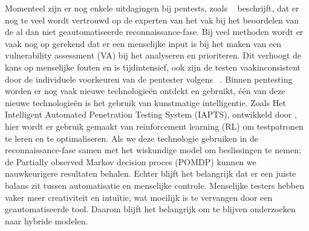 Momenteel zijn er nog enkele uitdagingen bij pentests, zoals ~\textcite{Fugkeaw} beschrijft, dat er nog te veel wordt vertrouwd 
op de experten van het vak bij het beoordelen van de al dan niet geautomatiseerde reconnaissance-fase. Bij veel methoden wordt er vaak nog op gerekend dat er een menselijke input is bij het maken van een vulnerability assessment (VA) bij het analyseren en prioriteren. Dit verhoogt de kans op menselijke fouten en is tijdintensief, ook zijn de testen vaakinconsistent door de individuele voorkeuren van de pentester volgens ~\textcite{Ghanem}.
Binnen pentesting worden er nog vaak nieuwe technologieën ontdekt en gebruikt, één van deze nieuwe technologieën is het gebruik van kunstmatige intelligentie. Zoals Het Intelligent Automated Penetration Testing System (IAPTS), ontwikkeld door \textcite{Ghanem}, hier wordt er gebruik gemaakt van reinforcement learning (RL) om testpatronen te leren en te optimaliseren. Als we deze technologie gebruiken in de reconnaissance-fase samen met het wiskundige model om beslissingen te nemen; de Partially observed Markov decision proces (POMDP) kunnen we nauwkeurigere resultaten behalen. Echter blijft het belangrijk dat er een juiste balans zit tussen automatisatie en menselijke controle. Menselijke testers hebben vaker meer creativiteit en intuïtie, wat moeilijk is te vervangen door een geautomatiseerde tool. Daarom blijft het belangrijk om te blijven onderzoeken naar hybride modelen.








